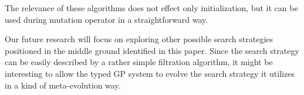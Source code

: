 \documentclass{llncs}
\newcommand{\red}[1]{{\color{red} #1}}
\begin{document}

The relevance of these algorithms does not effect only initialization, but it can be used during mutation
operator in a straightforward way. 

Our future research will focus on exploring other possible search strategies positioned in the middle ground 
identified in this paper. Since the search strategy can be easily described by a rather simple filtration algorithm, it might be
interesting to allow the typed GP system to evolve the search strategy it 
utilizes in a kind of meta-evolution way. 



\nocite{*}



\end{document}
